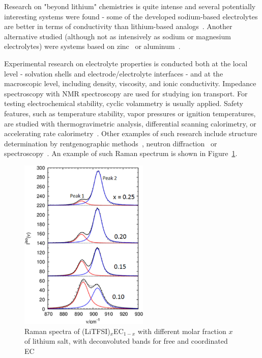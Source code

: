 Research on "beyond lithium" chemistries is quite intense and several potentially interesting systems were found - some of the developed sodium-based electrolytes are better in terms of conductivity than lithium-based analogs~\cite{na-fsi}. Another alternative studied (although not as intensively as sodium or magnesium electrolytes) were systems based on zinc~\cite{na-il-10, zn-1, zn-2} or aluminum~\cite{al-1,al-2,al-3}.

Experimental research on electrolyte properties is conducted both at the local level - solvation shells and electrode/electrolyte interfaces - and at the macroscopic level, including density, viscosity, and ionic conductivity. Impedance spectroscopy with NMR spectroscopy are used for studying ion transport. For testing electrochemical stability, cyclic volammetry is usually applied. Safety features, such as temperature stability, vapor pressures or ignition temperatures, are studied with thermogravimetric analysis, differential scanning calorimetry, or accelerating rate calorimetry~\cite{na-ion-4}. Other examples of such research include structure determination by rentgenographic methods~\cite{roentgen-exp}, neutron diffraction~\cite{neutron-diffraction} or spectroscopy~\cite{spectroscopy-structure-1,spectroscopy-structure-2}. An example of such Raman spectrum is shown in Figure~\ref{fig:introduction-li-tfsi-raman}.

\begin{figure}[ht]
    \centering
    \includegraphics[width=0.55\textwidth]{img/1-introduction/li-tfsi-raman.png}
    \caption{Raman spectra of (LiTFSI)$_x$EC$_{1 - x}$ with different molar fraction $x$ of lithium salt, with deconvoluted bands for free and coordinated EC~\cite{neutron-diffraction}}
    \label{fig:introduction-li-tfsi-raman}
\end{figure}